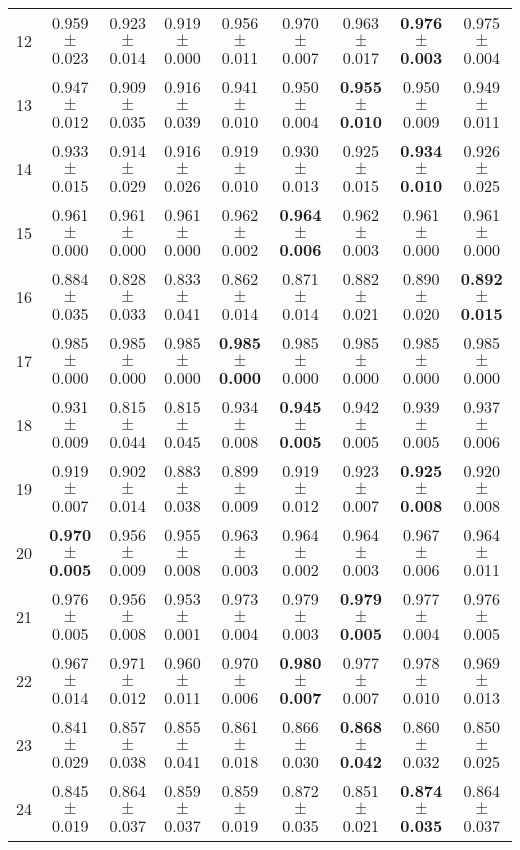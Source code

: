 \begin{table}[!ht]
{\begin{tabular}{r c c c c c c c c}
12 & 0.959 $\pm$ 0.023 & 0.923 $\pm$ 0.014 & 0.919 $\pm$ 0.000 & 0.956 $\pm$ 0.011 & 0.970 $\pm$ 0.007 & 0.963 $\pm$ 0.017 & \textbf{0.976 $\pm$ 0.003} & 0.975 $\pm$ 0.004 \\
13 & 0.947 $\pm$ 0.012 & 0.909 $\pm$ 0.035 & 0.916 $\pm$ 0.039 & 0.941 $\pm$ 0.010 & 0.950 $\pm$ 0.004 & \textbf{0.955 $\pm$ 0.010} & 0.950 $\pm$ 0.009 & 0.949 $\pm$ 0.011 \\
14 & 0.933 $\pm$ 0.015 & 0.914 $\pm$ 0.029 & 0.916 $\pm$ 0.026 & 0.919 $\pm$ 0.010 & 0.930 $\pm$ 0.013 & 0.925 $\pm$ 0.015 & \textbf{0.934 $\pm$ 0.010} & 0.926 $\pm$ 0.025 \\
15 & 0.961 $\pm$ 0.000 & 0.961 $\pm$ 0.000 & 0.961 $\pm$ 0.000 & 0.962 $\pm$ 0.002 & \textbf{0.964 $\pm$ 0.006} & 0.962 $\pm$ 0.003 & 0.961 $\pm$ 0.000 & 0.961 $\pm$ 0.000 \\
16 & 0.884 $\pm$ 0.035 & 0.828 $\pm$ 0.033 & 0.833 $\pm$ 0.041 & 0.862 $\pm$ 0.014 & 0.871 $\pm$ 0.014 & 0.882 $\pm$ 0.021 & 0.890 $\pm$ 0.020 & \textbf{0.892 $\pm$ 0.015} \\
17 & 0.985 $\pm$ 0.000 & 0.985 $\pm$ 0.000 & 0.985 $\pm$ 0.000 & \textbf{0.985 $\pm$ 0.000} & 0.985 $\pm$ 0.000 & 0.985 $\pm$ 0.000 & 0.985 $\pm$ 0.000 & 0.985 $\pm$ 0.000 \\
18 & 0.931 $\pm$ 0.009 & 0.815 $\pm$ 0.044 & 0.815 $\pm$ 0.045 & 0.934 $\pm$ 0.008 & \textbf{0.945 $\pm$ 0.005} & 0.942 $\pm$ 0.005 & 0.939 $\pm$ 0.005 & 0.937 $\pm$ 0.006 \\
19 & 0.919 $\pm$ 0.007 & 0.902 $\pm$ 0.014 & 0.883 $\pm$ 0.038 & 0.899 $\pm$ 0.009 & 0.919 $\pm$ 0.012 & 0.923 $\pm$ 0.007 & \textbf{0.925 $\pm$ 0.008} & 0.920 $\pm$ 0.008 \\
20 & \textbf{0.970 $\pm$ 0.005} & 0.956 $\pm$ 0.009 & 0.955 $\pm$ 0.008 & 0.963 $\pm$ 0.003 & 0.964 $\pm$ 0.002 & 0.964 $\pm$ 0.003 & 0.967 $\pm$ 0.006 & 0.964 $\pm$ 0.011 \\
21 & 0.976 $\pm$ 0.005 & 0.956 $\pm$ 0.008 & 0.953 $\pm$ 0.001 & 0.973 $\pm$ 0.004 & 0.979 $\pm$ 0.003 & \textbf{0.979 $\pm$ 0.005} & 0.977 $\pm$ 0.004 & 0.976 $\pm$ 0.005 \\
22 & 0.967 $\pm$ 0.014 & 0.971 $\pm$ 0.012 & 0.960 $\pm$ 0.011 & 0.970 $\pm$ 0.006 & \textbf{0.980 $\pm$ 0.007} & 0.977 $\pm$ 0.007 & 0.978 $\pm$ 0.010 & 0.969 $\pm$ 0.013 \\
23 & 0.841 $\pm$ 0.029 & 0.857 $\pm$ 0.038 & 0.855 $\pm$ 0.041 & 0.861 $\pm$ 0.018 & 0.866 $\pm$ 0.030 & \textbf{0.868 $\pm$ 0.042} & 0.860 $\pm$ 0.032 & 0.850 $\pm$ 0.025 \\
24 & 0.845 $\pm$ 0.019 & 0.864 $\pm$ 0.037 & 0.859 $\pm$ 0.037 & 0.859 $\pm$ 0.019 & 0.872 $\pm$ 0.035 & 0.851 $\pm$ 0.021 & \textbf{0.874 $\pm$ 0.035} & 0.864 $\pm$ 0.037 \\

\end{tabular}}
\end{table}
